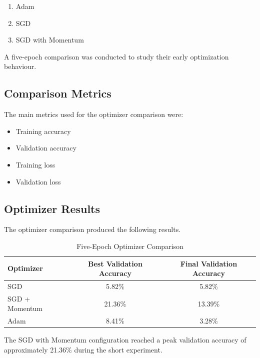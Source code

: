 \documentclass[12pt,a4paper]{report}
\begin{document}
\begin{enumerate}
    \item Adam
    \item SGD
    \item SGD with Momentum
\end{enumerate}

A five-epoch comparison was conducted to study their early
optimization behaviour.

\subsection{Comparison Metrics}

The main metrics used for the optimizer comparison were:

\begin{itemize}
    \item Training accuracy
    \item Validation accuracy
    \item Training loss
    \item Validation loss
\end{itemize}

\subsection{Optimizer Results}

The optimizer comparison produced the following results.

\begin{table}[H]
\centering
\caption{Five-Epoch Optimizer Comparison}
\label{tab:optimizer_comparison}

\begin{tabular}{lcc}
\toprule
\textbf{Optimizer} &
\textbf{Best Validation Accuracy} &
\textbf{Final Validation Accuracy} \\
\midrule
SGD & 5.82\% & 5.82\% \\
SGD + Momentum &  21.36\% & 13.39\% \\
Adam & 8.41\% & 3.28\% \\
\bottomrule
\end{tabular}

\end{table}

The SGD with Momentum configuration reached a peak validation
accuracy of approximately 21.36\% during the short experiment.
\end{document}
